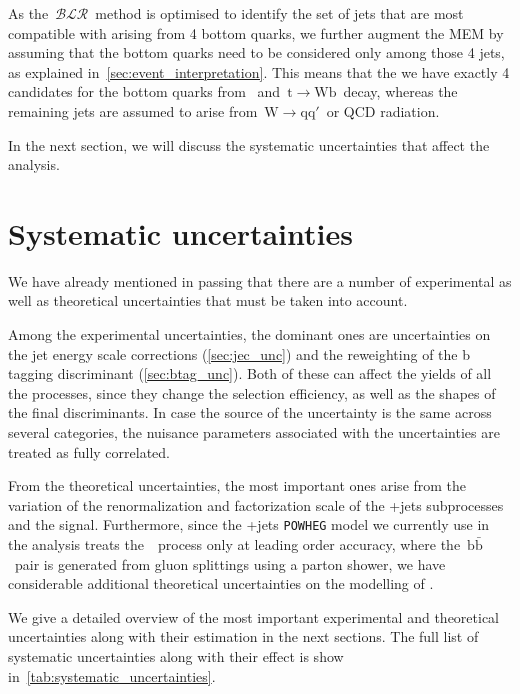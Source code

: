 As the~$\mathcal{BLR}$~method is optimised to identify the set of jets that are most compatible with arising from 4 bottom quarks, we further augment the MEM by assuming that the bottom quarks need to be considered only among those 4 jets, as explained in~\cref{sec:event_interpretation}. This means that the we have exactly 4 candidates for the bottom quarks from \Hbb~and~$\mathrm{t} \rightarrow \mathrm{W} \mathrm{b}$~decay, whereas the remaining jets are assumed to arise from~$\mathrm{W} \rightarrow \mathrm{q} \mathrm{q}'$~or QCD radiation. 

In the next section, we will discuss the systematic uncertainties that affect the analysis.

\section{Systematic uncertainties}
\label{sec:systematic_unc}
We have already mentioned in passing that there are a number of experimental as well as theoretical uncertainties that must be taken into account.

Among the experimental uncertainties, the dominant ones are uncertainties on the jet energy scale corrections (\cref{sec:jec_unc}) and the reweighting of the b tagging discriminant (\cref{sec:btag_unc}). Both of these can affect the yields of all the processes, since they change the selection efficiency, as well as the shapes of the final discriminants. In case the source of the uncertainty is the same across several categories, the nuisance parameters associated with the uncertainties are treated as fully correlated.

From the theoretical uncertainties, the most important ones arise from the variation of the renormalization and factorization scale of the \ttbar+jets subprocesses and the \ttH signal. Furthermore, since the \ttbar+jets \texttt{POWHEG} model we currently use in the analysis treats the~\ttbb~process only at leading order accuracy, where the~$\mathrm{b}\bar{\mathrm{b}}$~pair is generated from gluon splittings using a parton shower, we have considerable additional theoretical uncertainties on the modelling of \ttbb.

We give a detailed overview of the most important experimental and theoretical uncertainties along with their estimation in the next sections. The full list of systematic uncertainties along with their effect is show in~\cref{tab:systematic_uncertainties}.

